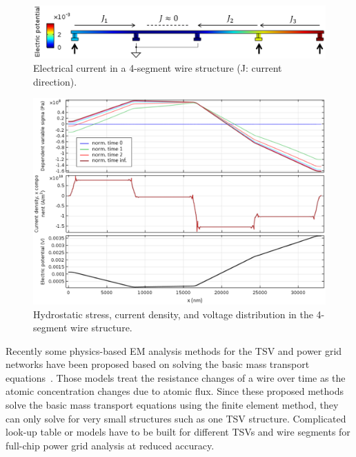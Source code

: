 \begin{figure}[h]
\centering
\includegraphics[width=0.95\columnwidth]{4seg_demo}
\caption{Electrical current in a 4-segment wire structure (J: current direction).}
\label{fig:4seg-demo}
\end{figure}

\begin{figure}[h]
\centering
\includegraphics[width=0.95\columnwidth]{4seg_multiplot}
\caption{Hydrostatic stress, current density, and voltage distribution in the 4-segment wire structure.}
\label{fig:4seg-multiplot}
\end{figure}


Recently some physics-based EM analysis methods for the
TSV and power grid networks have been proposed based on solving the
basic mass transport
equations~\cite{Pak:2011cx,Pathak:2011kz,Zhao:2013cv,Pak:2013bh}.
Those models treat the resistance changes of a wire over time as the
atomic concentration changes due to atomic flux. Since these proposed
methods solve the basic mass transport equations using the finite
element method, they can only solve for very small structures such as
one TSV structure. Complicated look-up table or models have to be
built for different TSVs and wire segments for full-chip power grid
analysis at reduced accuracy.

